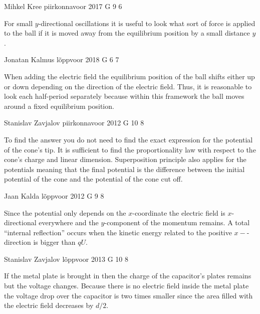\documentclass[11pt]{article}
\begin{document}
{Mihkel Kree} %
{piirkonnavoor} %
{2017} %
{G 9} %
{6} %
{

\ifEngHint
For small $y$-directional oscillations it is useful to look what sort of force is applied to the ball if it is moved away from the equilibrium position by a small distance $y$.
\fi
}

{Jonatan Kalmus} %
{lõppvoor} %
{2018} %
{G 6} %
{7} %
{

\ifEngHint
When adding the electric field the equilibrium position of the ball shifts either up or down depending on the direction of the electric field. Thus, it is reasonable to look each half-period separately because within this framework the ball moves around a fixed equilibrium position.
\fi
}

{Stanislav Zavjalov} %
{piirkonnavoor} %
{2012} %
{G 10} %
{8} %
{

\ifEngHint
To find the answer you do not need to find the exact expression for the potential of the cone's tip. It is sufficient to find the proportionality law with respect to the cone's charge and linear dimension. Superposition principle also applies for the potentials meaning that the final potential is the difference between the initial potential of the cone and the potential of the cone cut off.
\fi
}

{Jaan Kalda} %
{lõppvoor} %
{2012} %
{G 9} %
{8} %
{

\ifEngHint
Since the potential only depends on the $x$-coordinate the electric field is $x$-directional everywhere and the $y$-component of the momentum remains. A total “internal reflection” occurs when the kinetic energy related to the positive $x-$-direction is bigger than $qU$.
\fi
}

{Stanislav Zavjalov} %
{lõppvoor} %
{2013} %
{G 10} %
{8} %
{

\ifEngHint
If the metal plate is brought in then the charge of the capacitor's plates remains but the voltage changes. Because there is no electric field inside the metal plate the voltage drop over the capacitor is two times smaller since the area filled with the electric field decreases by $d/2$.
\fi
}
\end{document}
